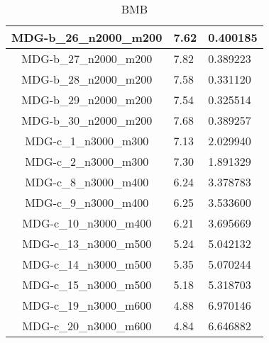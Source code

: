 \documentclass[10pt,a4paper]{article}
\begin{document}
\begin{table}[]
\begin{tabular}{|c|l|l|}
		MDG-b\_26\_n2000\_m200 & 7.62                               & 0.400185                             \\ \hline
		MDG-b\_27\_n2000\_m200 & 7.82                               & 0.389223                             \\ \hline
		MDG-b\_28\_n2000\_m200 & 7.58                               & 0.331120                             \\ \hline
		MDG-b\_29\_n2000\_m200 & 7.54                               & 0.325514                             \\ \hline
		MDG-b\_30\_n2000\_m200 & 7.68                               & 0.389257                             \\ \hline
		MDG-c\_1\_n3000\_m300  & 7.13                               & 2.029940                             \\ \hline
		MDG-c\_2\_n3000\_m300  & 7.30                               & 1.891329                             \\ \hline
		MDG-c\_8\_n3000\_m400  & 6.24                               & 3.378783                             \\ \hline
		MDG-c\_9\_n3000\_m400  & 6.25                               & 3.533600                             \\ \hline
		MDG-c\_10\_n3000\_m400 & 6.21                               & 3.695669                             \\ \hline
		MDG-c\_13\_n3000\_m500 & 5.24                               & 5.042132                             \\ \hline
		MDG-c\_14\_n3000\_m500 & 5.35                               & 5.070244                             \\ \hline
		MDG-c\_15\_n3000\_m500 & 5.18                               & 5.318703                             \\ \hline
		MDG-c\_19\_n3000\_m600 & 4.88                               & 6.970146                             \\ \hline
		MDG-c\_20\_n3000\_m600 & 4.84                               & 6.646882                             \\ \hline
	\end{tabular}
	\caption{BMB}
	\label{table:BMB}
\end{table}
\end{document}
